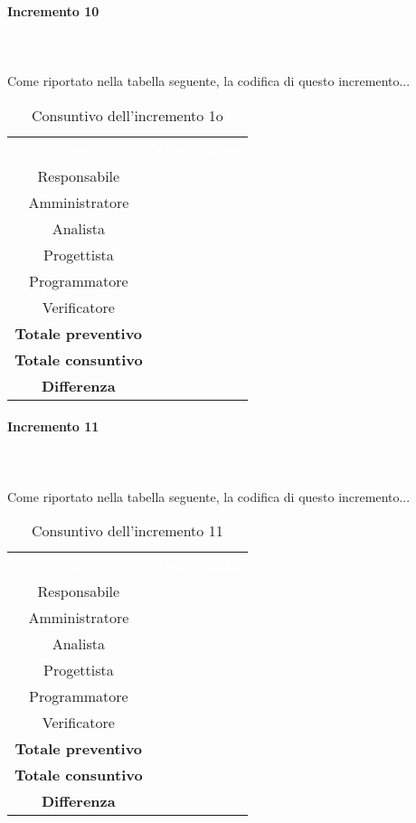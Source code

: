 \paragraph*{Incremento 10} \mbox{} \\ \mbox{} \\
Come riportato nella tabella seguente, la codifica di questo incremento...
\begin{table}[H]
\centering\renewcommand{\arraystretch}{1.5}
\caption{Consuntivo dell'incremento 1o}
\vspace{0.2cm}
\begin{tabular}{ c c c }
\rowcolor{redafk}
\textcolor{white}{\textbf{Ruolo}} & \textcolor{white}{\textbf{Ore}} &
\textcolor{white}{\textbf{Costo}}  \\
Responsabile 	&  &  \\
Amministratore 	&  	&  \\
Analista 		&   	&  \\
Progettista		&   	& \\
Programmatore	&  	& \\
Verificatore 	&  &  \\
\textbf{Totale preventivo} & &   \\
\textbf{Totale consuntivo} &  &   \\
\rowcolor{lastrowcolor}
\textbf{Differenza} & &  \\
\end{tabular}
\end{table}

\paragraph*{Incremento 11} \mbox{} \\ \mbox{} \\
Come riportato nella tabella seguente, la codifica di questo incremento...
\begin{table}[H]
\centering\renewcommand{\arraystretch}{1.5}
\caption{Consuntivo dell'incremento 11}
\vspace{0.2cm}
\begin{tabular}{ c c c }
\rowcolor{redafk}
\textcolor{white}{\textbf{Ruolo}} & \textcolor{white}{\textbf{Ore}} &
\textcolor{white}{\textbf{Costo}}  \\
Responsabile 	&  &  \\
Amministratore 	&  	&  \\
Analista 		&   	&  \\
Progettista		&   	& \\
Programmatore	&  	& \\
Verificatore 	&  &  \\
\textbf{Totale preventivo} & &   \\
\textbf{Totale consuntivo} &  &   \\
\rowcolor{lastrowcolor}
\textbf{Differenza} & &  \\
\end{tabular}
\end{table}

